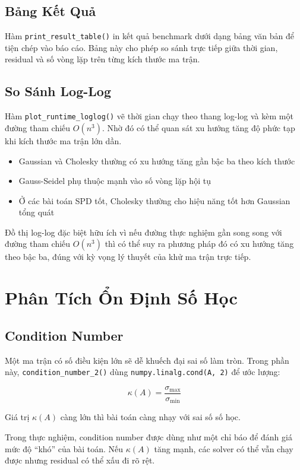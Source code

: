 \documentclass[12pt, a4paper, twoside]{article}
\begin{document}
\subsection{Bảng Kết Quả}

Hàm \texttt{print\_result\_table()} in kết quả benchmark dưới dạng bảng văn bản để tiện chép vào báo cáo. Bảng này cho phép so sánh trực tiếp giữa thời gian, residual và số vòng lặp trên từng kích thước ma trận.

\subsection{So Sánh Log-Log}

Hàm \texttt{plot\_runtime\_loglog()} vẽ thời gian chạy theo thang log-log và kèm một đường tham chiếu $O(n^3)$. Nhờ đó có thể quan sát xu hướng tăng độ phức tạp khi kích thước ma trận lớn dần.

\begin{itemize}
    \item Gaussian và Cholesky thường có xu hướng tăng gần bậc ba theo kích thước
    \item Gauss-Seidel phụ thuộc mạnh vào số vòng lặp hội tụ
    \item Ở các bài toán SPD tốt, Cholesky thường cho hiệu năng tốt hơn Gaussian tổng quát
\end{itemize}

Đồ thị log-log đặc biệt hữu ích vì nếu đường thực nghiệm gần song song với đường tham chiếu $O(n^3)$ thì có thể suy ra phương pháp đó có xu hướng tăng theo bậc ba, đúng với kỳ vọng lý thuyết của khử ma trận trực tiếp.

\section{Phân Tích Ổn Định Số Học}

\subsection{Condition Number}

Một ma trận có số điều kiện lớn sẽ dễ khuếch đại sai số làm tròn. Trong phần này, \texttt{condition\_number\_2()} dùng \texttt{numpy.linalg.cond(A, 2)} để ước lượng:

\[
\kappa(A) = \frac{\sigma_{\max}}{\sigma_{\min}}
\]

Giá trị $\kappa(A)$ càng lớn thì bài toán càng nhạy với sai số số học.

Trong thực nghiệm, condition number được dùng như một chỉ báo để đánh giá mức độ “khó” của bài toán. Nếu $\kappa(A)$ tăng mạnh, các solver có thể vẫn chạy được nhưng residual có thể xấu đi rõ rệt.
\end{document}
